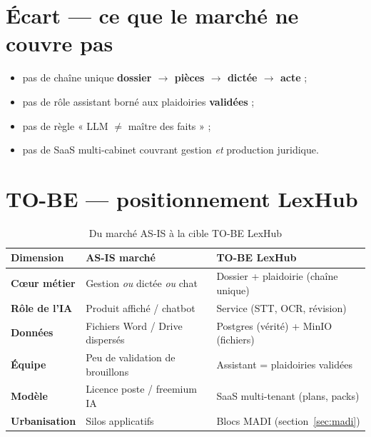\section{Écart --- ce que le marché ne couvre pas}
\label{sec:gap-benchmark}

\begin{itemize}[leftmargin=1.4em]
  \item pas de chaîne unique \textbf{dossier $\rightarrow$ pièces $\rightarrow$ dictée $\rightarrow$ acte} ;
  \item pas de rôle assistant borné aux plaidoiries \textbf{validées} ;
  \item pas de règle « LLM $\neq$ maître des faits » ;
  \item pas de SaaS multi-cabinet couvrant gestion \emph{et} production juridique.
\end{itemize}

\section{TO-BE --- positionnement LexHub}
\label{sec:to-be-position}

\begin{table}[H]
\centering
\caption{Du marché AS-IS à la cible TO-BE LexHub}
\label{tab:as-to-be}
\small
\renewcommand{\arraystretch}{1.3}
\begin{tabularx}{\textwidth}{@{}>{\bfseries}p{2.6cm}XX@{}}
\toprule
Dimension & AS-IS marché & TO-BE LexHub \\
\midrule
Cœur métier & Gestion \emph{ou} dictée \emph{ou} chat & Dossier + plaidoirie (chaîne unique) \\
Rôle de l'IA & Produit affiché / chatbot & Service (STT, OCR, révision) \\
Données & Fichiers Word / Drive dispersés & Postgres (vérité) + MinIO (fichiers) \\
Équipe & Peu de validation de brouillons & Assistant = plaidoiries validées \\
Modèle & Licence poste / freemium IA & SaaS multi-tenant (plans, packs) \\
Urbanisation & Silos applicatifs & Blocs MADI (section~\ref{sec:madi}) \\
\bottomrule
\end{tabularx}
\end{table}

